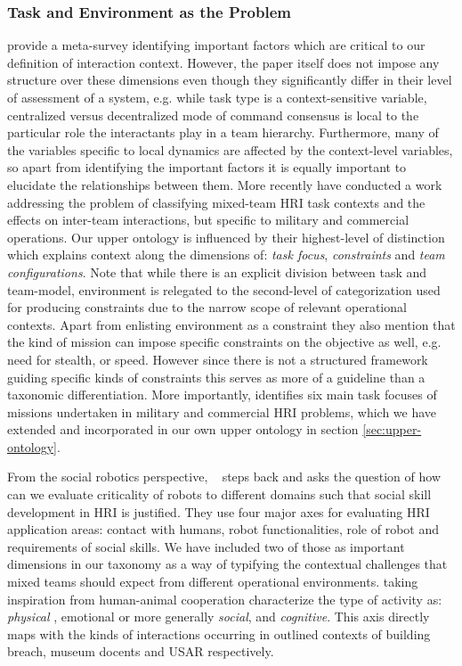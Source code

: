\documentclass[letterpaper, 10 pt, conference]{ieeeconf}  %
\theoremstyle{definition}
\newcommand{\citet}[1]{\citeauthor{#1}~\cite{#1}}
\begin{document}
\subsubsection{Task and Environment as the Problem}
\citeauthor{Yanco2004updated} \cite{Yanco2004updated} provide a meta-survey identifying important factors which are critical to our definition of interaction context.
However, the paper itself does not impose any structure over these dimensions even though they significantly differ in their level of assessment of a system, e.g. while task type is a context-sensitive variable, centralized versus decentralized mode of command consensus is local to the particular role the interactants play in a team hierarchy.
Furthermore, many of the variables specific to local dynamics are affected by the context-level variables, so apart from identifying the important factors it is equally important to elucidate the relationships between them.
More recently \cite{Beer2017} have conducted a work addressing the problem of classifying mixed-team HRI task contexts and the effects on inter-team interactions, but specific to military and commercial operations.
Our upper ontology is influenced by their highest-level of distinction which explains context along the dimensions of: \textit{task focus}, \textit{constraints} and \textit{team configurations}.
Note that while there is an explicit division between task and team-model, environment is relegated to the second-level of categorization used for producing constraints due to the narrow scope of relevant operational contexts.
Apart from enlisting environment as a constraint they also mention that the kind of mission can impose specific constraints on the objective as well, e.g. need for stealth, or speed.
However since there is not a structured framework guiding specific kinds of constraints this serves as more of a guideline than a taxonomic differentiation.
More importantly, \cite{Beer2017} identifies six main task focuses of missions undertaken in military and commercial HRI problems, which we have extended and incorporated in our own upper ontology in section \ref{sec:upper-ontology}.

From the social robotics perspective, \citet{Dautenhahn2007} steps back and asks the question of how can we evaluate criticality of robots to different domains such that social skill development in HRI is justified.
They use four major axes for evaluating HRI application areas: contact with humans, robot functionalities, role of robot and requirements of social skills.
We have included two of those as important dimensions in our taxonomy as a way of typifying the contextual challenges that mixed teams should expect from different operational environments.
\cite{Phillips2015} taking inspiration from human-animal cooperation characterize the type of activity as: \textit{physical} , emotional or more generally \textit{social}, and \textit{cognitive}.
This axis directly maps with the kinds of interactions occurring in outlined contexts of building breach, museum docents and USAR respectively.
\end{document}
